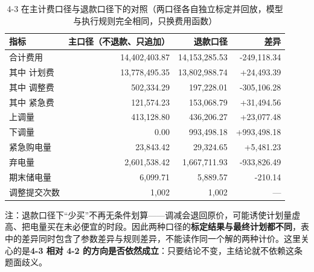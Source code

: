 
\begin{table}[htbp]
  \centering
  \caption{4-3 在主计费口径与退款口径下的对照（两口径各自独立标定并回放，模型与执行规则完全相同，只换费用函数）}
  \label{tab:p4-refund}
  \footnotesize
  \begin{tabular}{lrrr}
    \toprule
    指标 & 主口径（不退款、只追加） & 退款口径 & 差异 \\
    \midrule
    合计费用 & 14,402,403.87 & 14,153,285.53 & -249,118.34 \\
    其中 计划费 & 13,778,495.35 & 13,802,988.74 & +24,493.39 \\
    其中 调整费 & 502,334.29 & 197,228.01 & -305,106.28 \\
    其中 紧急费 & 121,574.23 & 153,068.79 & +31,494.56 \\
    上调量 & 413,128.80 & 436,206.27 & +23,077.48 \\
    下调量 & 0.00 & 993,498.18 & +993,498.18 \\
    紧急购电量 & 23,843.42 & 29,324.65 & +5,481.23 \\
    弃电量 & 2,601,538.42 & 1,667,711.93 & -933,826.49 \\
    期末储电量 & 6,099.71 & 5,889.57 & -210.14 \\
    调整提交次数 & 1,002 & 1,002 & --- \\
    \bottomrule
  \end{tabular}
  \par\vspace{2pt}
  \begin{minipage}{.92\textwidth}\footnotesize
    注：退款口径下“少买”不再无条件划算——调减会退回原价，可能诱使计划量虚高、把电量买在未必便宜的时段。因此两种口径的\textbf{标定结果与最终计划都不同}，表中的差异同时包含了参数差异与规则差异，不能读作同一个解的两种计价。这里关心的是\textbf{4-3 相对 4-2 的方向是否依然成立}：只要结论不变，主结论就不依赖这条题面歧义。
  \end{minipage}
\end{table}
